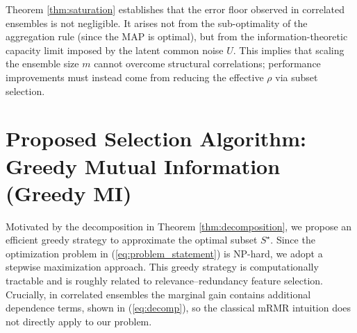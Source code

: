 \documentclass{article}
\theoremstyle{plain}
\theoremstyle{definition}
\theoremstyle{remark}
\begin{document}
Theorem \ref{thm:saturation} establishes that the error floor observed in correlated ensembles is not negligible. It arises not from the sub-optimality of the aggregation rule (since the MAP is optimal), but from the information-theoretic capacity limit imposed by the latent common noise $U$. This implies that scaling the ensemble size $m$ cannot overcome structural correlations; performance improvements must instead come from reducing the effective $\rho$ via subset selection.



\section{Proposed Selection Algorithm: Greedy Mutual Information (Greedy MI)}
\label{sec:algorithm}

Motivated by the decomposition in Theorem \ref{thm:decomposition}, we propose an efficient greedy strategy to approximate the optimal subset $S^\star$. Since the optimization problem in (\ref{eq:problem_statement}) is NP-hard, we adopt a stepwise maximization approach. This greedy strategy is computationally tractable and is roughly related to relevance--redundancy feature selection. Crucially, in correlated ensembles the marginal gain contains additional dependence terms, shown in (\ref{eq:decomp}), so the classical mRMR intuition does not directly apply to our problem.
\end{document}
